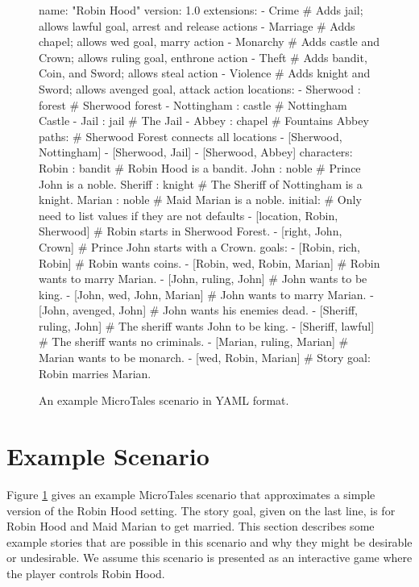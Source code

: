 \documentclass{nilreport}
\begin{document}
\newpage

\begin{figure}[!ht]
{\small
\begin{code}
name: "Robin Hood"
version: 1.0
extensions:
- Crime    # Adds jail; allows lawful goal, arrest and release actions
- Marriage # Adds chapel; allows wed goal, marry action
- Monarchy # Adds castle and Crown; allows ruling goal, enthrone action
- Theft    # Adds bandit, Coin, and Sword; allows steal action
- Violence # Adds knight and Sword; allows avenged goal, attack action
locations:
- Sherwood : forest   # Sherwood forest
- Nottingham : castle # Nottingham Castle
- Jail : jail         # The Jail
- Abbey : chapel      # Fountains Abbey
paths: # Sherwood Forest connects all locations
- [Sherwood, Nottingham]
- [Sherwood, Jail]
- [Sherwood, Abbey]
characters:
  Robin : bandit   # Robin Hood is a bandit.
  John : noble     # Prince John is a noble.
  Sheriff : knight # The Sheriff of Nottingham is a knight.
  Marian : noble   # Maid Marian is a noble.
initial: # Only need to list values if they are not defaults
- [location, Robin, Sherwood] # Robin starts in Sherwood Forest.
- [right, John, Crown]        # Prince John starts with a Crown.
goals:
- [Robin, rich, Robin]        # Robin wants coins.
- [Robin, wed, Robin, Marian] # Robin wants to marry Marian.
- [John, ruling, John]        # John wants to be king.
- [John, wed, John, Marian]   # John wants to marry Marian.
- [John, avenged, John]       # John wants his enemies dead.
- [Sheriff, ruling, John]     # The sheriff wants John to be king.
- [Sheriff, lawful]           # The sheriff wants no criminals.
- [Marian, ruling, Marian]    # Marian wants to be monarch.
- [wed, Robin, Marian]        # Story goal: Robin marries Marian.
\end{code}}
\vspace{-1em}
\caption{An example MicroTales scenario in YAML format.}
\label{fig:problemex}
\end{figure}

\section{Example Scenario}

Figure \ref{fig:problemex} gives an example MicroTales scenario that approximates a simple version of the Robin Hood setting. The story goal, given on the last line, is for Robin Hood and Maid Marian to get married. This section describes some example stories that are possible in this scenario and why they might be desirable or undesirable. We assume this scenario is presented as an interactive game where the player controls Robin Hood.
\end{document}

